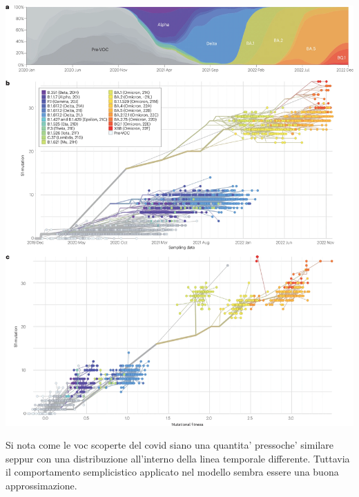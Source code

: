 \begin{minipage}{\linewidth}
	\centering
	\includegraphics[scale=0.15]{img/41579_2023_878_Fig3_HTML.png}
	\label{fig:covid_mutation}
\end{minipage}

Si nota come le voc scoperte del covid siano una quantita' pressoche' similare
seppur con una distribuzione all'interno della linea temporale differente.
Tuttavia il comportamento semplicistico applicato nel modello sembra essere 
una buona approssimazione.
